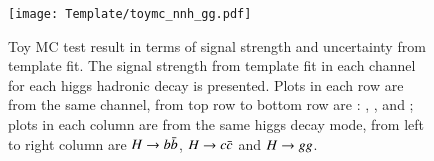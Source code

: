\begin{figure}[!htpb]
{     \begin{minipage}[b]{0.31\textwidth}
     \texttt{[image: Template/toymc\_nnh\_gg.pdf]}
     \end{minipage}
}
\caption{Toy MC test result in terms of signal strength and uncertainty from template fit. The signal strength from template fit in each channel for each higgs hadronic decay is presented. Plots in each row are from the same channel, from top row to bottom row are : \eeh, \mmh, \nnh and \qqh; plots in each column are from the same higgs decay mode, from left to right column are $H\rightarrow b\bar{b}$, $H\rightarrow c\bar{c}$ and $H\rightarrow gg$.}
\label{fig:toymc_subchannel}
\end{figure}

